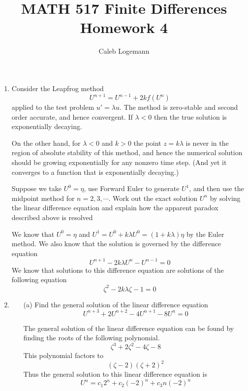 \documentclass[11pt, oneside, titlepage]{article}
\title{MATH 517 Finite Differences Homework 4}
\author{Caleb Logemann}
\begin{document}
\maketitle

%
\begin{enumerate}
    \item %
        Consider the Leapfrog method
        \[
            U^{n+1} = U^{n−1} + 2k f(U^n)
        \]
        applied to the test problem $u′ = \lambda u$.
        The method is zero-stable and second order accurate, and hence convergent.
        If $\lambda < 0$ then the true solution is exponentially decaying.

        On the other hand, for $\lambda < 0$ and $k > 0$ the point $z = k\lambda$ is never in the
        region of absolute stability of this method,
        and hence the numerical solution should be growing exponentially for any
        nonzero time step.
        (And yet it converges to a function that is exponentially decaying.)

        Suppose we take $U^0 = \eta$, use Forward Euler to generate $U^1$, and
        then use the midpoint method for $n = 2, 3, \cdots$.
        Work out the exact solution $U^n$ by solving the linear difference
        equation and explain how the apparent paradox described above is resolved

        We know that $U^0 = \eta$ and
        $U^1 = U^0 + k \lambda U^0 = (1 + k\lambda)\eta$ by the Euler method.
        We also know that the solution is governed by the difference equation
        \[
            U^{n+1} - 2k\lambda U^n - U^{n-1} = 0
        \]
        We know that solutions to this difference equation are solutions of the
        following equation
        \[
            \zeta^2 - 2k\lambda \zeta - 1 = 0
        \]

    \item %
        \begin{enumerate}
            \item[(a)]
                Find the general solution of the linear difference equation
                \[
                    U^{n+3} + 2U^{n+2} - 4U^{n + 1} - 8U^n = 0
                \]

                The general solution of the linear difference equation can be
                found by finding the roots of the following polynomial.
                \[
                    \zeta^3 + 2\zeta^2 - 4\zeta - 8
                \]
                This polynomial factors to
                \[
                    (\zeta - 2)(\zeta + 2)^2
                \]
                Thus the general solution to this linear difference equation is
                \[
                    U^n = c_1 2^n + c_2 (-2)^n + c_3 n (-2)^n
                \]


\end{enumerate}
\end{enumerate}
\end{document}
